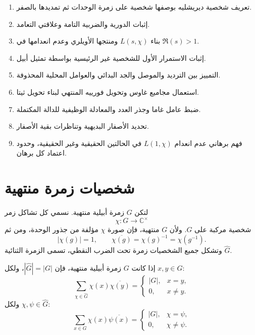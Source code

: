 \begin{enumerate}
  \item تعريف شخصية ديريشليه بوصفها شخصية على زمرة الوحدات ثم تمديدها
  بالصفر.
  \item إثبات الدورية والضربية التامة وعلاقتي التعامد.
  \item بناء \(L(s,\chi)\) ومنتجها الأويلري وعدم انعدامها في
  \(\Re(s)>1\).
  \item إثبات الاستمرار الأول للشخصية غير الرئيسية بواسطة تمثيل أبيل.
  \item التمييز بين الترديد والموصل والجد البدائي والعوامل المحلية المحذوفة.
  \item استعمال مجاميع غاوس وتحويل فورييه المنتهي لبناء تحويل ثيتا.
  \item ضبط عامل غاما وجذر العدد والمعادلة الوظيفية للدالة المكتملة.
  \item تحديد الأصفار البديهية وتناظرات بقية الأصفار.
  \item فهم برهاني عدم انعدام \(L(1,\chi)\) في الحالتين الحقيقية وغير
  الحقيقية، وحدود اعتماد كل برهان.
\end{enumerate}

\section{شخصيات زمرة منتهية}

لتكن \(G\) زمرة أبيلية منتهية. نسمي كل تشاكل زمر
\[
\chi:G\longrightarrow \mathbb{C}^{\times}
\]
شخصية مركبة على \(G\). ولأن \(G\) منتهية، فإن صورة \(\chi\) مؤلفة من
جذور الوحدة، ومن ثم
\[
|\chi(g)|=1,
\qquad
\overline{\chi(g)}=\chi(g)^{-1}=\chi(g^{-1}).
\]
وتشكل جميع الشخصيات زمرة تحت الضرب النقطي، تسمى الزمرة الثنائية
\(\widehat G\).

\begin{theorem}
\label{thm:finite-character-orthogonality}
\provedhere
إذا كانت \(G\) زمرة أبيلية منتهية، فإن \(|\widehat G|=|G|\)، ولكل
\(x,y\in G\):
\[
\sum_{\chi\in\widehat G}\chi(x)\overline{\chi(y)}
=
\begin{cases}
|G|,&x=y,\\
0,&x\ne y.
\end{cases}
\]
ولكل \(\chi,\psi\in\widehat G\):
\[
\sum_{x\in G}\chi(x)\overline{\psi(x)}
=
\begin{cases}
|G|,&\chi=\psi,\\
0,&\chi\ne\psi.
\end{cases}
\]
\end{theorem}

